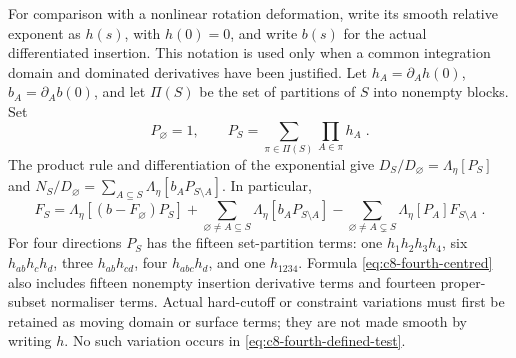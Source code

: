 \documentclass[11pt]{article}
\begin{document}
For comparison with a nonlinear rotation deformation, write its smooth
relative exponent as $h(s)$, with $h(0)=0$, and write $b(s)$ for the
actual differentiated insertion. This notation is used only when a
common integration domain and dominated derivatives have been justified.
Let $h_A=\partial_Ah(0)$, $b_A=\partial_Ab(0)$, and let $\Pi(S)$ be
the set of partitions of $S$ into nonempty blocks. Set
\begin{equation}\label{eq:c8-fourth-bell}
    P_\varnothing=1,\qquad
    P_S=\sum_{\pi\in\Pi(S)}\prod_{A\in\pi}h_A\;.
\end{equation}
The product rule and differentiation of the exponential give
$D_S/D_\varnothing=\Lambda_\eta[P_S]$ and
$N_S/D_\varnothing=\sum_{A\subseteq S}
\Lambda_\eta[b_AP_{S\setminus A}]$. In particular,
\begin{equation}\label{eq:c8-fourth-centred}
    F_S=\Lambda_\eta[(b-F_\varnothing)P_S]
        +\sum_{\varnothing\neq A\subseteq S}
            \Lambda_\eta[b_AP_{S\setminus A}]
        -\sum_{\varnothing\neq A\subsetneq S}
            \Lambda_\eta[P_A]F_{S\setminus A}\;.
\end{equation}
For four directions $P_S$ has the fifteen set-partition terms: one
$h_1h_2h_3h_4$, six $h_{ab}h_ch_d$, three $h_{ab}h_{cd}$, four
$h_{abc}h_d$, and one $h_{1234}$. Formula
\eqref{eq:c8-fourth-centred} also includes fifteen nonempty insertion
derivative terms and fourteen proper-subset normaliser terms. Actual
hard-cutoff or constraint variations must first be retained as moving
domain or surface terms; they are not made smooth by writing $h$.
No such variation occurs in \eqref{eq:c8-fourth-defined-test}.
\end{document}
